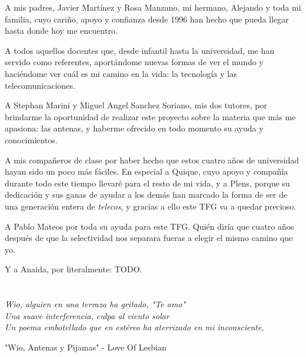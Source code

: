 \par A mis padres, Javier Martínez y Rosa Manzano, mi hermano, Alejando y toda mi familia, cuyo cariño, apoyo y confianza desde 1996 han hecho que pueda llegar hasta donde hoy me encuentro.



\par A todos aquellos docentes que, desde infantil hasta la universidad, me han servido como referentes, aportándome nuevas formas de ver el mundo y haciéndome ver cuál es mi camino en la vida: la tecnología y las telecomunicaciones.




\par A Stephan Marini y Miguel Angel Sanchez Soriano, mis dos tutores, por brindarme la oportunidad de realizar este proyecto sobre la materia que más me apasiona: las antenas, y haberme ofrecido en todo momento su ayuda y conocimientos.




\par A mis compañeros de clase por haber hecho que estos cuatro años de universidad hayan sido un poco más fáciles. En especial a Quique, cuyo apoyo y compañía durante todo este tiempo llevaré para el resto de mi vida, y a Plens, porque su dedicación y sus ganas de ayudar a los demás han marcado la forma de ser de una generación entera de \textit{telecos}, y gracias a ello este TFG va a quedar precioso. 




\par A Pablo Mateos por toda su ayuda para este TFG. Quién diría que cuatro años después de que la selectividad nos separara fueras a elegir el mismo camino que yo.




\par Y a Anaida, por literalmente: TODO. 
\cleardoublepage %
\chapter*{}
\setlength{\leftmargin}{0.5\textwidth}
\setlength{\parsep}{0cm}
\addtolength{\topsep}{0.5cm}
\begin{flushright}
\small\em{
Wio, alguien en una terraza ha gritado, "Te amo"\\
Una suave interferencia, culpa al viento solar\\
Un poema embotellado que en estéreo ha aterrizado en mi inconsciente,\\}
\end{flushright}


\begin{flushright}
\small{
"Wio, Antenas y Pijamas" - Love Of Lesbian
}
\end{flushright}


\cleardoublepage %

